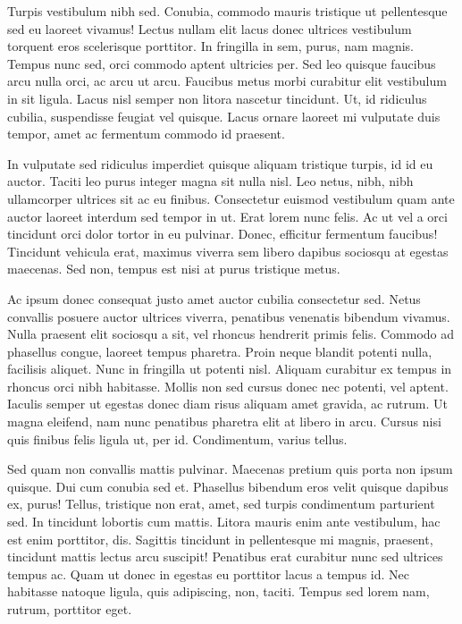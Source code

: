 \documentclass[
  11pt,
  letterpaper,
  DIV=11,
  numbers=noendperiod]{scrartcl}
\begin{document}
Turpis vestibulum nibh sed. Conubia, commodo mauris tristique ut
pellentesque sed eu laoreet vivamus! Lectus nullam elit lacus donec
ultrices vestibulum torquent eros scelerisque porttitor. In fringilla in
sem, purus, nam magnis. Tempus nunc sed, orci commodo aptent ultricies
per. Sed leo quisque faucibus arcu nulla orci, ac arcu ut arcu. Faucibus
metus morbi curabitur elit vestibulum in sit ligula. Lacus nisl semper
non litora nascetur tincidunt. Ut, id ridiculus cubilia, suspendisse
feugiat vel quisque. Lacus ornare laoreet mi vulputate duis tempor, amet
ac fermentum commodo id praesent.

In vulputate sed ridiculus imperdiet quisque aliquam tristique turpis,
id id eu auctor. Taciti leo purus integer magna sit nulla nisl. Leo
netus, nibh, nibh ullamcorper ultrices sit ac eu finibus. Consectetur
euismod vestibulum quam ante auctor laoreet interdum sed tempor in ut.
Erat lorem nunc felis. Ac ut vel a orci tincidunt orci dolor tortor in
eu pulvinar. Donec, efficitur fermentum faucibus! Tincidunt vehicula
erat, maximus viverra sem libero dapibus sociosqu at egestas maecenas.
Sed non, tempus est nisi at purus tristique metus.

Ac ipsum donec consequat justo amet auctor cubilia consectetur sed.
Netus convallis posuere auctor ultrices viverra, penatibus venenatis
bibendum vivamus. Nulla praesent elit sociosqu a sit, vel rhoncus
hendrerit primis felis. Commodo ad phasellus congue, laoreet tempus
pharetra. Proin neque blandit potenti nulla, facilisis aliquet. Nunc in
fringilla ut potenti nisl. Aliquam curabitur ex tempus in rhoncus orci
nibh habitasse. Mollis non sed cursus donec nec potenti, vel aptent.
Iaculis semper ut egestas donec diam risus aliquam amet gravida, ac
rutrum. Ut magna eleifend, nam nunc penatibus pharetra elit at libero in
arcu. Cursus nisi quis finibus felis ligula ut, per id. Condimentum,
varius tellus.

Sed quam non convallis mattis pulvinar. Maecenas pretium quis porta non
ipsum quisque. Dui cum conubia sed et. Phasellus bibendum eros velit
quisque dapibus ex, purus! Tellus, tristique non erat, amet, sed turpis
condimentum parturient sed. In tincidunt lobortis cum mattis. Litora
mauris enim ante vestibulum, hac est enim porttitor, dis. Sagittis
tincidunt in pellentesque mi magnis, praesent, tincidunt mattis lectus
arcu suscipit! Penatibus erat curabitur nunc sed ultrices tempus ac.
Quam ut donec in egestas eu porttitor lacus a tempus id. Nec habitasse
natoque ligula, quis adipiscing, non, taciti. Tempus sed lorem nam,
rutrum, porttitor eget.
\end{document}
